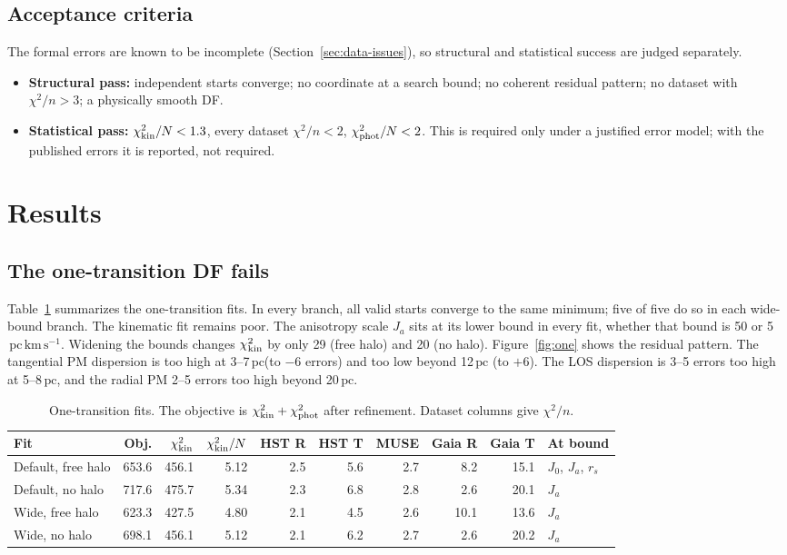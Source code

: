 \documentclass[11pt,a4paper]{article}
\newcommand{\pc}{\ensuremath{\,\mathrm{pc}}\xspace}
\newcommand{\Jact}{\ensuremath{\,\mathrm{pc\,km\,s^{-1}}}\xspace}
\newcommand{\chikin}{\ensuremath{\chi^2_{\rm kin}}\xspace}
\begin{document}
\subsection{Acceptance criteria}

The formal errors are known to be incomplete (Section~\ref{sec:data-issues}),
so structural and statistical success are judged separately.
\begin{itemize}
\item \textbf{Structural pass:} independent starts converge; no coordinate at
  a search bound; no coherent residual pattern; no dataset with $\chi^2/n>3$;
  a physically smooth DF.
\item \textbf{Statistical pass:} $\chikin/N<1.3$, every dataset $\chi^2/n<2$,
  $\chi^2_{\rm phot}/N<2$. This is required only under a justified error
  model; with the published errors it is reported, not required.
\end{itemize}

\section{Results}
\label{sec:results}

\subsection{The one-transition DF fails}
\label{sec:one}

Table~\ref{tab:one} summarizes the one-transition fits. In every branch, all
valid starts converge to the same minimum; five of five do so in each
wide-bound branch. The kinematic fit remains poor. The anisotropy scale $J_a$
sits at its lower bound in every fit, whether that bound is 50 or 5\Jact.
Widening the bounds changes $\chikin$ by only 29 (free halo) and 20 (no
halo). Figure~\ref{fig:one} shows the residual pattern. The tangential PM
dispersion is too high at 3--7\pc (to $-6$ errors) and too low beyond 12\pc
(to $+6$). The LOS dispersion is 3--5 errors too high at 5--8\pc, and the
radial PM 2--5 errors too high beyond 20\pc.

\begin{table}[htbp]
\centering\small
\caption{One-transition fits. The objective is $\chikin+\chi^2_{\rm phot}$
after refinement. Dataset columns give $\chi^2/n$.}
\label{tab:one}
\begin{tabular}{lrrrrrrrrl}
\toprule
Fit & Obj. & $\chikin$ & $\chikin/N$ & HST R & HST T & MUSE & Gaia R & Gaia T & At bound\\
\midrule
Default, free halo & 653.6 & 456.1 & 5.12 & 2.5 & 5.6 & 2.7 & 8.2 & 15.1 & $J_0$, $J_a$, $r_s$\\
Default, no halo & 717.6 & 475.7 & 5.34 & 2.3 & 6.8 & 2.8 & 2.6 & 20.1 & $J_a$\\
Wide, free halo & 623.3 & 427.5 & 4.80 & 2.1 & 4.5 & 2.6 & 10.1 & 13.6 & $J_a$\\
Wide, no halo & 698.1 & 456.1 & 5.12 & 2.1 & 6.2 & 2.7 & 2.6 & 20.2 & $J_a$\\
\bottomrule
\end{tabular}
\end{table}
\end{document}
